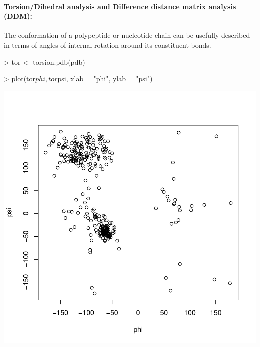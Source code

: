 \documentclass[a4paper]{article}
\begin{document}
\paragraph{Torsion/Dihedral analysis and Difference distance matrix analysis (DDM):}
The conformation of a polypeptide or nucleotide chain can be usefully described in terms of angles of internal rotation around its constituent bonds.
\begin{Schunk}
\begin{Sinput}
> tor <- torsion.pdb(pdb)
\end{Sinput}
\end{Schunk}
\begin{center}
\begin{Schunk}
\begin{Sinput}
> plot(tor$phi, tor$psi, xlab = "phi", ylab = "psi")
\end{Sinput}
\end{Schunk}
\includegraphics{figs/fig-028}
\end{center}
\end{document}
